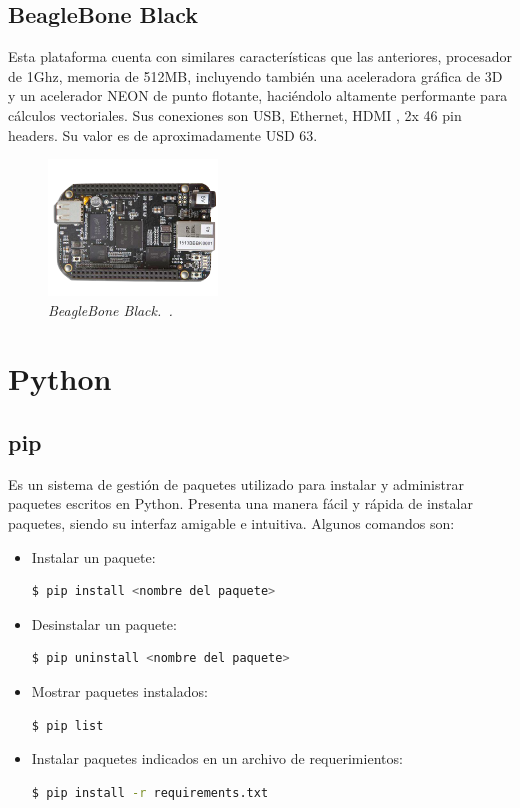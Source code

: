 \subsection{BeagleBone Black}
Esta plataforma cuenta con similares características que las anteriores, procesador de 1Ghz, memoria de 512MB, incluyendo también una aceleradora gráfica de 3D y un acelerador NEON de punto flotante, haciéndolo altamente performante para cálculos vectoriales. Sus conexiones son USB, Ethernet, HDMI , 2x 46 pin headers. Su valor es de aproximadamente USD 63.

\begin{figure}[h!]
  \centering
  \includegraphics[width=0.4\textwidth, keepaspectratio]{images/bbb}
  \caption{\textit{BeagleBone Black.~\cite{BeagleB}.}}
  \label{fig:bbb}
\end{figure}

\section{Python}
\subsection{pip}
Es un sistema de gestión de paquetes utilizado para instalar y administrar paquetes escritos en Python. Presenta una manera fácil y rápida de instalar paquetes, siendo su interfaz amigable e intuitiva. Algunos comandos son:

\begin{itemize}
\item Instalar un paquete:
\begin{lstlisting}[language=bash]
  $ pip install <nombre del paquete>
\end{lstlisting}	

\item Desinstalar un paquete:
\begin{lstlisting}[language=bash]
  $ pip uninstall <nombre del paquete>
\end{lstlisting}
	

\item Mostrar paquetes instalados:
\begin{lstlisting}[language=bash]
  $ pip list
\end{lstlisting}
	

\item Instalar paquetes indicados en un archivo de requerimientos:
\begin{lstlisting}[language=bash]
  $ pip install -r requirements.txt
\end{lstlisting}

\end{itemize}

